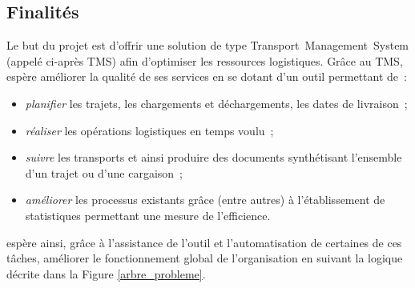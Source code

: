 \subsection{Finalités}
Le but du projet est d'offrir une solution de type Transport~Management~System (appelé ci-après TMS) afin d'optimiser les ressources logistiques.
Grâce au TMS, \mo espère améliorer la qualité de ses services en se dotant d'un outil permettant de~:
\begin{itemize}
	\item \emph{planifier} les trajets, les chargements et déchargements, les dates de livraison~;
	\item \emph{réaliser} les opérations logistiques en temps voulu~;
	\item \emph{suivre} les transports et ainsi produire des documents synthétisant l'ensemble d'un trajet ou d'une cargaison~;
	\item \emph{améliorer} les processus existants grâce (entre autres) à l'établissement de statistiques permettant une mesure de l'efficience.
\end{itemize}
\mo espère ainsi, grâce à l'assistance de l'outil et l'automatisation de certaines de ces tâches, améliorer le fonctionnement global de l'organisation en suivant la logique décrite dans la Figure \ref{arbre_probleme}.

